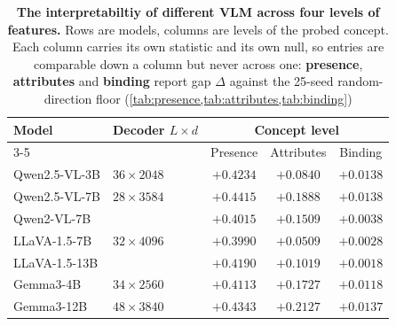 \begin{table}[t]
    \centering
    \footnotesize
    \setlength{\tabcolsep}{5pt}
    \begin{tabular}{llccc}
        \toprule
        \multirow{2}{*}{Model} & \multirow{2}{*}{Decoder $L\times d$} & \multicolumn{3}{c}{Concept level} \\
        \cmidrule(lr){3-5}
                               &                                      & Presence & Attributes & Binding  \\
        \midrule
        Qwen2.5-VL-3B  & $36\times2048$ & $+0.4234$ & $+0.0840$ & $+0.0138$ \\
        Qwen2.5-VL-7B  & $28\times3584$ & $+0.4415$ & $+0.1888$ & $+0.0138$ \\
        Qwen2-VL-7B    &           & $+0.4015$ & $+0.1509$ & $+0.0038$ \\
        LLaVA-1.5-7B   & $32\times4096$ & $+0.3990$ & $+0.0509$ & $+0.0028$ \\
        LLaVA-1.5-13B  &            & $+0.4190$ & $+0.1019$ & $+0.0018$ \\
        Gemma3-4B      & $34\times2560$ & $+0.4113$ & $+0.1727$ & $+0.0118$ \\
        Gemma3-12B     & $48\times3840$ & $+0.4343$ & $+0.2127$ & $+0.0137$ \\
        \bottomrule
    \end{tabular}
    \caption{\textbf{The interpretabiltiy of different VLM across four levels of features.} Rows are models, columns are levels of
        the probed concept. Each column carries its own statistic and its own
        null, so entries are comparable down a column but never across one:
        \textbf{presence}, \textbf{attributes} and \textbf{binding} report gap
        $\Delta$ against the 25-seed random-direction floor
        (\cref{tab:presence,tab:attributes,tab:binding})}
    \label{tab:ladder}
\end{table}


